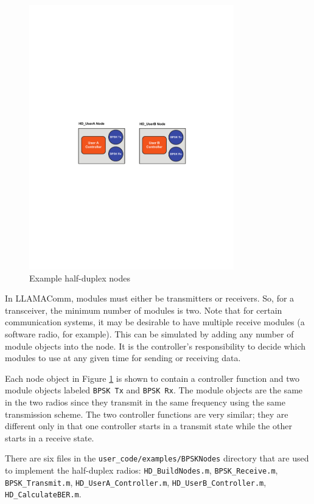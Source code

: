 \begin{figure}[h]
\centering
\includegraphics[width=3.5in]{figs/HD_Example}
\caption{Example half-duplex nodes} \label{fig:hdNodes}
\end{figure}

In LLAMAComm, modules must either be transmitters or receivers.  So,
for a transceiver, the minimum number of modules is two.  Note that
for certain communication systems, it may be desirable to have
multiple receive modules (a software radio, for example). This can
be simulated by adding any number of module objects into the node.
It is the controller's responsibility to decide which modules to use
at any given time for sending or receiving data.

Each node object in Figure \ref{fig:hdNodes} is shown to contain a
controller function and two module objects labeled \verb+BPSK Tx+
and \verb+BPSK Rx+.  The module objects are the same in the two
radios since they transmit in the same frequency using the same
transmission scheme. The two controller functions are very similar;
they are different only in that one controller starts in a transmit
state while the other starts in a receive state.

There are six files in the \verb+user_code/examples/BPSKNodes+ directory 
that are
used to implement the half-duplex radios: \verb+HD_BuildNodes.m+,
\verb+BPSK_Receive.m+, \verb+BPSK_Transmit.m+,
\verb+HD_UserA_Controller.m+, \verb+HD_UserB_Controller.m+,
\verb+HD_CalculateBER.m+.

